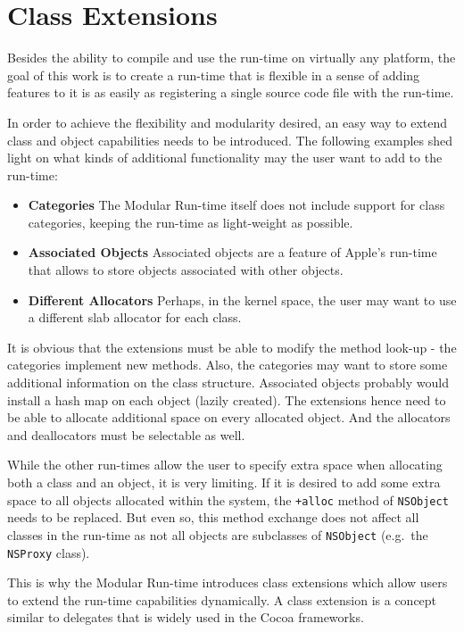 \section{Class Extensions}

Besides the ability to compile and use the run-time on virtually any platform, the goal of this work is to create a run-time that is flexible in a sense of adding features to it is as easily as registering a single source code file with the run-time.

In order to achieve the flexibility and modularity desired, an easy way to extend class and object capabilities needs to be introduced. The following examples shed light on what kinds of additional functionality may the user want to add to the run-time:

\begin{itemize}
  \item{\bf{Categories}} The Modular Run-time itself does not include support for class categories, keeping the run-time as light-weight as possible.
  \item{\bf{Associated Objects}} Associated objects are a feature of Apple's run-time that allows to store objects associated with other objects.
  \item{\bf{Different Allocators}} Perhaps, in the kernel space, the user may want to use a different slab allocator for each class.
\end{itemize}

It is obvious that the extensions must be able to modify the method look-up - the categories implement new methods. Also, the categories may want to store some additional information on the class structure. Associated objects probably would install a hash map on each object (lazily created). The extensions hence need to be able to allocate additional space on every allocated object. And the allocators and deallocators must be selectable as well.

While the other run-times allow the user to specify extra space when allocating both a class and an object, it is very limiting. If it is desired to add some extra space to all objects allocated within the system, the \verb=+alloc= method of \verb=NSObject= needs to be replaced. But even so, this method exchange does not affect all classes in the run-time as not all objects are subclasses of \verb=NSObject= (e.g.\ the \verb=NSProxy= class).

This is why the Modular Run-time introduces class extensions which allow users to extend the run-time capabilities dynamically. A class extension is a concept similar to delegates that is widely used in the Cocoa frameworks.

